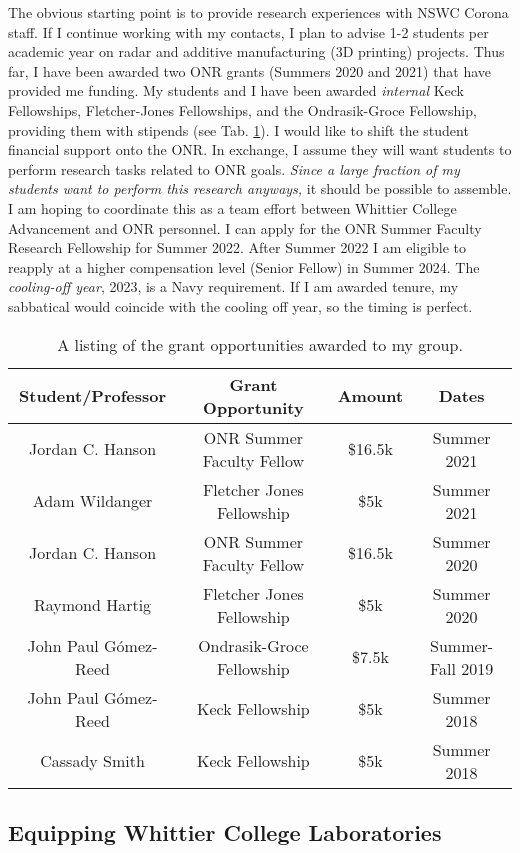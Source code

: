 \documentclass[../../../main.tex]{subfiles}
\begin{document}
The obvious starting point is to provide research experiences with NSWC Corona staff.  If I continue working with my contacts, I plan to advise 1-2 students per academic year on radar and additive manufacturing (3D printing) projects.  Thus far, I have been awarded two ONR grants (Summers 2020 and 2021) that have provided me funding.  My students and I have been awarded \textit{internal} Keck Fellowships, Fletcher-Jones Fellowships, and the Ondrasik-Groce Fellowship, providing them with stipends (see Tab. \ref{tab:funds}).  I would like to shift the student financial support onto the ONR.  In exchange, I assume they will want students to perform research tasks related to ONR goals.  \textit{Since a large fraction of my students want to perform this research anyways,} it should be possible to assemble.  I am hoping to coordinate this as a team effort between Whittier College Advancement and ONR personnel.  I can apply for the ONR Summer Faculty Research Fellowship for Summer 2022.  After Summer 2022 I am eligible to reapply at a higher compensation level (Senior Fellow) in Summer 2024.  The \textit{cooling-off year}, 2023, is a Navy requirement.  If I am awarded tenure, my sabbatical would coincide with the cooling off year, so the timing is perfect.

\begin{table}
\centering
\begin{tabular}{c c c c}
Student/Professor & Grant Opportunity & Amount & Dates \\ \hline
Jordan C. Hanson & ONR Summer Faculty Fellow & \$16.5k & Summer 2021 \\
Adam Wildanger & Fletcher Jones Fellowship & \$5k & Summer 2021 \\
Jordan C. Hanson & ONR Summer Faculty Fellow & \$16.5k & Summer 2020 \\
Raymond Hartig & Fletcher Jones Fellowship & \$5k & Summer 2020 \\
John Paul G\'{o}mez-Reed & Ondrasik-Groce Fellowship & \$7.5k & Summer-Fall 2019 \\
John Paul G\'{o}mez-Reed & Keck Fellowship & \$5k & Summer 2018 \\
Cassady Smith & Keck Fellowship & \$5k & Summer 2018 \\
\end{tabular}
\caption{\label{tab:funds} A listing of the grant opportunities awarded to my group.}
\end{table}
 
\subsection{Equipping Whittier College Laboratories}
\end{document}
